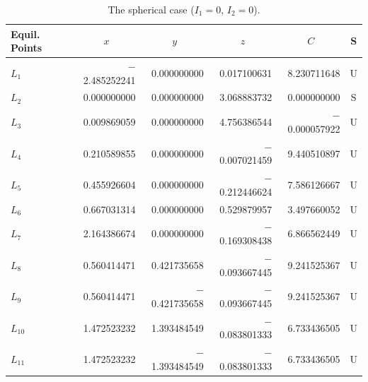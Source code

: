 \documentclass[qe,nameyear,draft]{econsocart}
\theoremstyle{plain}
\theoremstyle{remark}
\begin{document}
\begin{table}
\caption{The spherical case ($I_1=0$, $I_2=0$).}
\label{sphericcase}
\begin{tabular}{@{}lrrrrc@{}@{}}
\hline
Equil. Points
& \multicolumn{1}{c}{$x$}
& \multicolumn{1}{c}{$y$}
& \multicolumn{1}{c}{$z$}
& \multicolumn{1}{c}{$C$}
& S \\
\hline
$L_1$    & $-$2.485252241 & 0.000000000    & 0.017100631    & 8.230711648    & U \\
$L_2$    & 0.000000000    & 0.000000000    & 3.068883732    & 0.000000000    & S \\
$L_3$    & 0.009869059    & 0.000000000    & 4.756386544    & $-$0.000057922 & U \\
$L_4$    & 0.210589855    & 0.000000000    & $-$0.007021459 & 9.440510897    & U \\
$L_5$    & 0.455926604    & 0.000000000    & $-$0.212446624 & 7.586126667    & U \\
$L_6$    & 0.667031314    & 0.000000000    & 0.529879957    & 3.497660052    & U \\
$L_7$    & 2.164386674    & 0.000000000    & $-$0.169308438 & 6.866562449    & U \\
$L_8$    & 0.560414471    & 0.421735658    & $-$0.093667445 & 9.241525367    & U \\
$L_9$    & 0.560414471    & $-$0.421735658 & $-$0.093667445 & 9.241525367    & U \\
$L_{10}$ & 1.472523232    & 1.393484549    & $-$0.083801333 & 6.733436505    & U \\
$L_{11}$ & 1.472523232    & $-$1.393484549 & $-$0.083801333 & 6.733436505    & U \\
\hline
\end{tabular}
\end{table}
\end{document}
